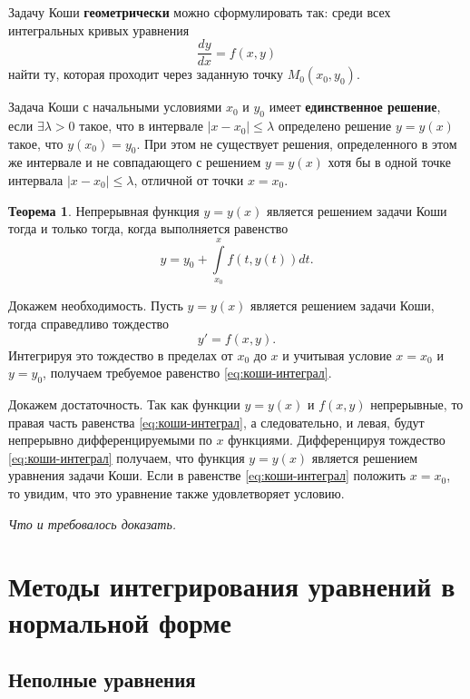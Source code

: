 \documentclass[a5paper, 11pt]{extbook}
\theoremstyle{definition}
\newtheorem{theorem}{Теорема}[section]
\theoremstyle{definition}
\theoremstyle{definition}
\newcommand{\newpar}{$ $\par\nobreak\ignorespaces}
\renewenvironment{proof}{{\noindent\bfseries Доказательство.}}{\smallskip\newpar \hfill\textit{Что и требовалось доказать.}}
\begin{document}
Задачу Коши \textbf{геометрически} можно сформулировать так: среди всех интегральных кривых уравнения
\begin{equation}
    \frac{dy}{dx} = f(x, y)
\end{equation}
найти ту, которая проходит через заданную точку \(M_0 (x_0, y_0)\).

Задача Коши с начальными условиями \(x_0\) и \(y_0\) имеет \textbf{единственное решение}, если \(\exists \lambda > 0\) такое, что в интервале \(|x - x_0| \leq \lambda\) определено решение \(y = y(x)\) такое, что \(y(x_0) = y_0\). При этом не существует решения, определенного в этом же интервале и не совпадающего с решением \(y = y(x)\) хотя бы в одной точке интервала \(|x - x_0| \leq \lambda\), отличной от точки \(x = x_0\).

\begin{theorem}
    Непрерывная функция \(y = y(x)\) является решением задачи Коши тогда и только тогда, когда выполняется равенство
    \begin{equation}
        \label{eq:коши-интеграл}
        y = y_0 + \int\limits_{x_0}^x f(t, y(t)) dt.
    \end{equation}

    \begin{proof}
        Докажем необходимость. Пусть \(y = y(x)\) является решением задачи Коши, тогда справедливо тождество
        \[
            y' = f(x, y).
        \]
        Интегрируя это тождество в пределах от \(x_0\) до \(x\) и учитывая условие \(x = x_0\) и \(y = y_0\), получаем требуемое равенство \eqref{eq:коши-интеграл}.

        Докажем достаточность. Так как функции \(y = y(x)\) и \(f(x, y)\) непрерывные, то правая часть равенства \eqref{eq:коши-интеграл}, а следовательно, и левая, будут непрерывно дифференцируемыми по \(x\) функциями. Дифференцируя тождество \eqref{eq:коши-интеграл} получаем, что функция \(y = y(x)\) является решением уравнения задачи Коши. Если в равенстве \eqref{eq:коши-интеграл} положить \(x = x_0\), то увидим, что это уравнение также удовлетворяет условию.
    \end{proof}
\end{theorem}

\chapter{Методы интегрирования уравнений в нормальной форме}

\section{Неполные уравнения}
\end{document}
